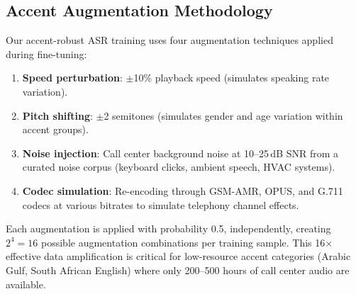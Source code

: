 \documentclass[conference,10pt]{IEEEtran}
\begin{document}
\begin{table}[!htbp]
\caption{ASR Performance Across Languages (WER \%)}
\label{tab:wer}
\centering\scriptsize
{}
\end{table}


\subsection{Accent Augmentation Methodology}

Our accent-robust ASR training uses four augmentation techniques applied during fine-tuning:

\begin{enumerate}
\item \textbf{Speed perturbation}: $\pm$10\% playback speed (simulates speaking rate variation).
\item \textbf{Pitch shifting}: $\pm$2 semitones (simulates gender and age variation within accent groups).
\item \textbf{Noise injection}: Call center background noise at 10--25\,dB SNR from a curated noise corpus (keyboard clicks, ambient speech, HVAC systems).
\item \textbf{Codec simulation}: Re-encoding through GSM-AMR, OPUS, and G.711 codecs at various bitrates to simulate telephony channel effects.
\end{enumerate}

Each augmentation is applied with probability 0.5, independently, creating $2^4 = 16$ possible augmentation combinations per training sample. This 16$\times$ effective data amplification is critical for low-resource accent categories (Arabic Gulf, South African English) where only 200--500 hours of call center audio are available.
\end{document}

